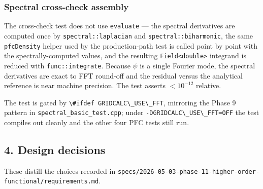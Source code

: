 \subsubsection{Spectral cross-check assembly}\label{phase11-spectral}

The cross-check test does not use
\passthrough{\lstinline!evaluate!} --- the spectral derivatives are
computed once by
\passthrough{\lstinline!spectral::laplacian!} and
\passthrough{\lstinline!spectral::biharmonic!}, the same
\passthrough{\lstinline!pfcDensity!} helper used by the production-path
test is called point by point with the spectrally-computed values, and
the resulting \passthrough{\lstinline!Field<double>!} integrand is
reduced with \passthrough{\lstinline!func::integrate!}. Because
\(\psi\) is a single Fourier mode, the spectral derivatives are exact
to FFT round-off and the residual versus the analytical reference is
near machine precision. The test asserts
\(< 10^{-12}\) relative.

The test is gated by
\passthrough{\lstinline!\#ifdef GRIDCALC\_USE\_FFT!}, mirroring the
Phase 9 pattern in
\passthrough{\lstinline!spectral_basic_test.cpp!}; under
\passthrough{\lstinline!-DGRIDCALC\_USE\_FFT=OFF!} the test compiles
out cleanly and the other four PFC tests still run.

\subsection{4. Design decisions}\label{phase11-decisions}

These distill the choices recorded in
\passthrough{\lstinline!specs/2026-05-03-phase-11-higher-order-functional/requirements.md!}.

